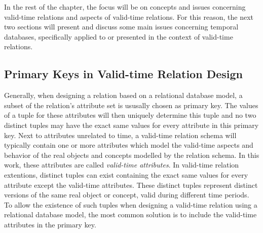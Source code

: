 
	
	
	



In the rest of the chapter, the focus will be on concepts and issues concerning valid-time relations and aspects of valid-time relations. For this reason, the next two sections will present and discuss some main issues concerning temporal databases, specifically applied to or presented in the context of valid-time relations.

\subsection{\label{subsubsec:primary-key}Primary Keys in Valid-time Relation Design}
Generally, when designing a relation based on a relational database model, a subset of the relation's attribute set is ususally chosen as primary key. The values of a tuple for these attributes will then uniquely determine this tuple and no two distinct tuples may have the exact same values for every attribute in this primary key. Next to attributes unrelated to time, a valid-time relation schema will typically contain one or more attributes which model the valid-time aspects and behavior of the real objects and concepts modelled by the relation schema. In this work, these attributes are called \emph{valid-time attributes}. In valid-time relation extentions, distinct tuples can exist containing the exact same values for every attribute except the valid-time attributes. These distinct tuples represent distinct versions of the same real object or concept, valid during different time periods. To allow the existence of such tuples when designing a valid-time relation using a relational database model, the most common solution is to include the valid-time attributes in the primary key.

